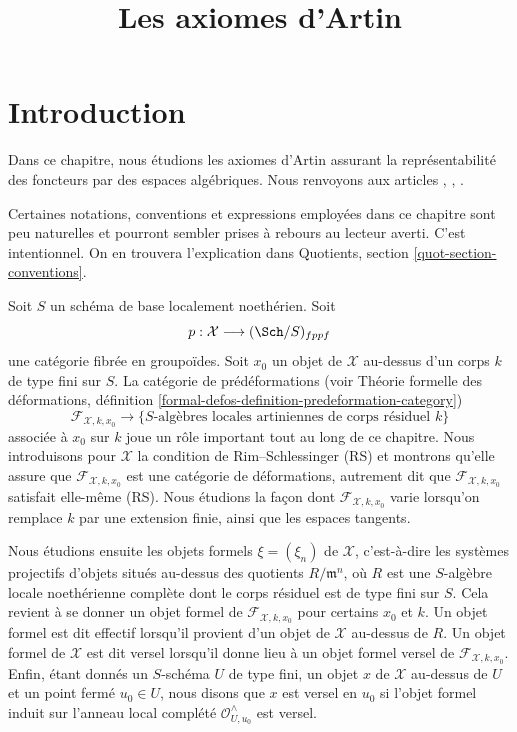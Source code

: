 

%


\title{Les axiomes d'Artin}

\maketitle

\label{section-phantom}

\tableofcontents




\section{Introduction}
\label{section-introduction}

\noindent
Dans ce chapitre, nous étudions les axiomes d'Artin assurant la
représentabilité des foncteurs par des espaces algébriques. Nous renvoyons aux
articles
\cite{ArtinI}, \cite{ArtinII}, \cite{ArtinVersal}.

\medskip\noindent
Certaines notations, conventions et expressions employées dans ce chapitre
sont peu naturelles et pourront sembler prises à rebours au lecteur averti.
C'est intentionnel. On en trouvera l'explication dans
Quotients, section \ref{quot-section-conventions}.

\medskip\noindent
Soit $S$ un schéma de base localement noethérien. Soit
$$
p : \mathcal{X} \longrightarrow (\Sch/S)_{fppf}
$$
une catégorie fibrée en groupoïdes. Soit $x_0$ un objet de $\mathcal{X}$
au-dessus d'un corps $k$ de type fini sur $S$. La catégorie de
prédéformations
(voir Théorie formelle des déformations,
définition \ref{formal-defos-definition-predeformation-category})
$$
\mathcal{F}_{\mathcal{X}, k, x_0}
\longrightarrow
\{\text{$S$-algèbres locales artiniennes de corps résiduel }k\}
$$
associée à $x_0$ sur $k$ joue un rôle important tout au long de ce chapitre.
Nous introduisons pour $\mathcal{X}$ la condition de Rim--Schlessinger (RS) et
montrons qu'elle assure que $\mathcal{F}_{\mathcal{X}, k, x_0}$ est une
catégorie de déformations, autrement dit que
$\mathcal{F}_{\mathcal{X}, k, x_0}$ satisfait elle-même (RS). Nous étudions la
façon dont $\mathcal{F}_{\mathcal{X}, k, x_0}$ varie lorsqu'on remplace $k$ par
une extension finie, ainsi que les espaces tangents.

\medskip\noindent
Nous étudions ensuite les objets formels $\xi = (\xi_n)$ de $\mathcal{X}$,
c'est-à-dire les systèmes projectifs d'objets situés au-dessus des quotients
$R/\mathfrak m^n$, où $R$ est une $S$-algèbre locale noethérienne complète
dont le corps résiduel est de type fini sur $S$. Cela revient à se donner un
objet formel de $\mathcal{F}_{\mathcal{X}, k, x_0}$ pour certains $x_0$ et $k$.
Un objet formel est dit effectif lorsqu'il provient d'un objet de
$\mathcal{X}$ au-dessus de $R$. Un objet formel de $\mathcal{X}$ est dit versel
lorsqu'il donne lieu à un objet formel versel de
$\mathcal{F}_{\mathcal{X}, k, x_0}$. Enfin, étant donnés un $S$-schéma $U$ de
type fini, un objet $x$ de $\mathcal{X}$ au-dessus de $U$ et un point fermé
$u_0 \in U$, nous disons que $x$ est versel en $u_0$ si l'objet formel induit
sur l'anneau local complété $\mathcal{O}_{U, u_0}^\wedge$ est versel.


